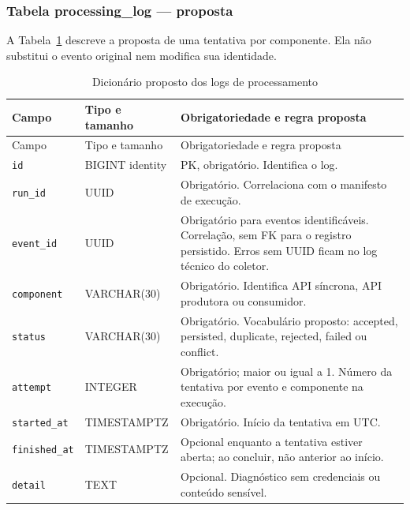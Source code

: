 \subsubsection{Tabela processing\_log --- proposta}
A Tabela~\ref{tab:dic-processing} descreve a proposta de uma tentativa por componente. Ela não substitui o evento original nem modifica sua identidade.

{\small
\begin{longtable}{>{\raggedright\arraybackslash}p{}>{\raggedright\arraybackslash}p{}>{\raggedright\arraybackslash}p{}}
\caption{Dicionário proposto dos logs de processamento}\label{tab:dic-processing}\\
\hline Campo & Tipo e tamanho & Obrigatoriedade e regra proposta\\ \hline
\endfirsthead
\hline Campo & Tipo e tamanho & Obrigatoriedade e regra proposta\\ \hline
\endhead
\texttt{id} & BIGINT identity & PK, obrigatório. Identifica o log.\\ \hline
\texttt{run\_id} & UUID & Obrigatório. Correlaciona com o manifesto de execução.\\ \hline
\texttt{event\_id} & UUID & Obrigatório para eventos identificáveis. Correlação, sem FK para o registro persistido. Erros sem UUID ficam no log técnico do coletor.\\ \hline
\texttt{component} & VARCHAR(30) & Obrigatório. Identifica API síncrona, API produtora ou consumidor.\\ \hline
\texttt{status} & VARCHAR(30) & Obrigatório. Vocabulário proposto: accepted, persisted, duplicate, rejected, failed ou conflict.\\ \hline
\texttt{attempt} & INTEGER & Obrigatório; maior ou igual a 1. Número da tentativa por evento e componente na execução.\\ \hline
\texttt{started\_at} & TIMESTAMPTZ & Obrigatório. Início da tentativa em UTC.\\ \hline
\texttt{finished\_at} & TIMESTAMPTZ & Opcional enquanto a tentativa estiver aberta; ao concluir, não anterior ao início.\\ \hline
\texttt{detail} & TEXT & Opcional. Diagnóstico sem credenciais ou conteúdo sensível.\\ \hline
\end{longtable}
\par
}

